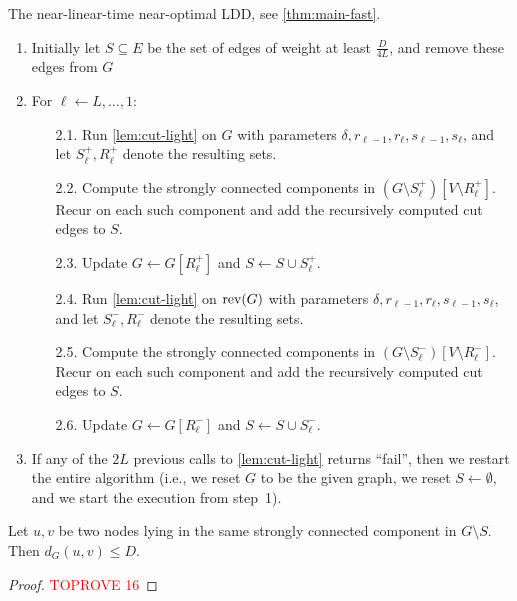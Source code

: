 \documentclass[letterpaper,11pt]{article}
\begin{document}
\begin{algorithm}[t]
\caption{The near-linear-time near-optimal LDD, see \cref{thm:main-fast}.} \label{alg:ldd-fast}
\begin{enumerate}
    \item Initially let $S \subseteq E$ be the set of edges of weight at least $\frac{D}{4L}$, and remove these edges from $G$
    \item For $\ell \gets L, \dots, 1$:
    \begin{enumerate}
        \item[2.1.] Run \cref{lem:cut-light} on $G$ with parameters $\delta, r_{\ell-1}, r_\ell, s_{\ell-1}, s_{\ell}$, and let $S^+_\ell, R^+_\ell$ denote the resulting sets.
        \item[2.2.] Compute the strongly connected components in $(G \setminus S^+_\ell)[V \setminus R^+_\ell]$. Recur on each such component and add the recursively computed cut edges to $S$.
        \item[2.3.] Update $G \gets G[R^+_\ell]$ and $S \gets S \cup S^+_\ell$.
        \item[2.4.] Run \cref{lem:cut-light} on $\operatorname{rev}(G)$ with parameters $\delta, r_{\ell-1}, r_\ell, s_{\ell-1}, s_{\ell}$, and let $S^-_\ell, R^-_\ell$ denote the resulting sets.
        \item[2.5.] Compute the strongly connected components in $(G \setminus S^-_\ell)[V \setminus R^-_\ell]$. Recur on each such component and add the recursively computed cut edges to $S$.
        \item[2.6.] Update $G \gets G[R^-_\ell]$ and $S \gets S \cup S^-_\ell$.
    \end{enumerate}
    \item If any of the $2L$ previous calls to \cref{lem:cut-light} returns ``fail'', then we restart the entire algorithm (i.e., we reset $G$ to be the given graph, we reset $S \gets \emptyset$, and we start the execution from step~1).
\end{enumerate}
\end{algorithm}

\begin{lemma} \label{lem:ldd-fast-correctness}
Let $u, v$ be two nodes lying in the same strongly connected component in $G \setminus S$. Then $d_G(u, v) \leq D$.
\end{lemma}
\begin{proof}\textcolor{red}{TOPROVE 16}\end{proof}
\end{document}
